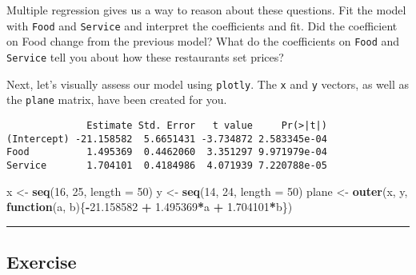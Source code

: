 \documentclass[]{book}
\newenvironment{Shaded}{\begin{snugshade}}{\end{snugshade}}
\newcommand{\KeywordTok}[1]{\textcolor[rgb]{0.13,0.29,0.53}{\textbf{#1}}}
\newcommand{\DataTypeTok}[1]{\textcolor[rgb]{0.13,0.29,0.53}{#1}}
\newcommand{\DecValTok}[1]{\textcolor[rgb]{0.00,0.00,0.81}{#1}}
\newcommand{\FloatTok}[1]{\textcolor[rgb]{0.00,0.00,0.81}{#1}}
\newcommand{\StringTok}[1]{\textcolor[rgb]{0.31,0.60,0.02}{#1}}
\newcommand{\ControlFlowTok}[1]{\textcolor[rgb]{0.13,0.29,0.53}{\textbf{#1}}}
\newcommand{\OperatorTok}[1]{\textcolor[rgb]{0.81,0.36,0.00}{\textbf{#1}}}
\newcommand{\NormalTok}[1]{#1}
\begin{document}
Multiple regression gives us a way to reason about these questions. Fit
the model with \texttt{Food} and \texttt{Service} and interpret the
coefficients and fit. Did the coefficient on Food change from the
previous model? What do the coefficients on \texttt{Food} and
\texttt{Service} tell you about how these restaurants set prices?

Next, let's visually assess our model using \texttt{plotly}. The
\texttt{x} and \texttt{y} vectors, as well as the \texttt{plane} matrix,
have been created for you.

\begin{Shaded}
\end{Shaded}

\begin{verbatim}
              Estimate Std. Error   t value     Pr(>|t|)
(Intercept) -21.158582  5.6651431 -3.734872 2.583345e-04
Food          1.495369  0.4462060  3.351297 9.971979e-04
Service       1.704101  0.4184986  4.071939 7.220788e-05
\end{verbatim}

\begin{Shaded}
\begin{Highlighting}[]
\NormalTok{x <-}\StringTok{ }\KeywordTok{seq}\NormalTok{(}\DecValTok{16}\NormalTok{, }\DecValTok{25}\NormalTok{, }\DataTypeTok{length =} \DecValTok{50}\NormalTok{)}
\NormalTok{y <-}\StringTok{ }\KeywordTok{seq}\NormalTok{(}\DecValTok{14}\NormalTok{, }\DecValTok{24}\NormalTok{, }\DataTypeTok{length =} \DecValTok{50}\NormalTok{)}
\NormalTok{plane <-}\StringTok{ }\KeywordTok{outer}\NormalTok{(x, y, }\ControlFlowTok{function}\NormalTok{(a, b)\{}\OperatorTok{-}\FloatTok{21.158582} \OperatorTok{+}\StringTok{ }\FloatTok{1.495369}\OperatorTok{*}\NormalTok{a }\OperatorTok{+}\StringTok{ }\FloatTok{1.704101}\OperatorTok{*}\NormalTok{b\})}
\end{Highlighting}
\end{Shaded}

\begin{center}\rule{0.5\linewidth}{\linethickness}\end{center}

\subsection*{Exercise}\label{exercise-22}
\end{document}
